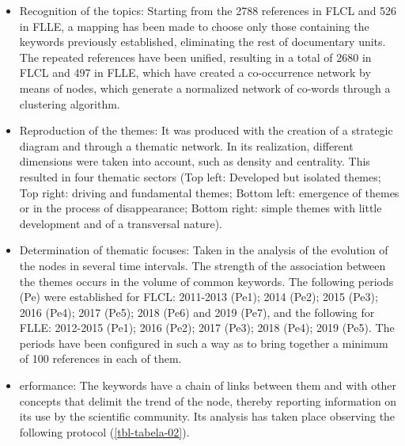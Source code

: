 \documentclass{textolivre}
\begin{document}
\begin{itemize}
    \item Recognition of the topics: Starting from the 2788 references in FLCL and 526 in FLLE, a mapping has been made to choose only those containing the keywords previously established, eliminating the rest of documentary units. The repeated references have been unified, resulting in a total of 2680 in FLCL and 497 in FLLE, which have created a co-occurrence network by means of nodes, which generate a normalized network of co-words through a clustering algorithm.
    \item Reproduction of the themes: It was produced with the creation of a strategic diagram and through a thematic network. In its realization, different dimensions were taken into account, such as density and centrality. This resulted in four thematic sectors (Top left: Developed but isolated themes; Top right: driving and fundamental themes; Bottom left: emergence of themes or in the process of disappearance; Bottom right: simple themes with little development and of a transversal nature).
    \item Determination of thematic focuses: Taken in the analysis of the evolution of the nodes in several time intervals. The strength of the association between the themes occurs in the volume of common keywords. The following periods (Pe) were established for FLCL: 2011-2013 (Pe1); 2014 (Pe2); 2015 (Pe3); 2016 (Pe4); 2017 (Pe5); 2018 (Pe6) and 2019 (Pe7), and the following for FLLE: 2012-2015 (Pe1); 2016 (Pe2); 2017 (Pe3); 2018 (Pe4); 2019 (Pe5). The periods have been configured in such a way as to bring together a minimum of 100 references in each of them.
    \item erformance: The keywords have a chain of links between them and with other concepts that delimit the trend of the node, thereby reporting information on its use by the scientific community. Its analysis has taken place observing the following protocol (\cref{tbl-tabela-02}).
\end{itemize}

\end{document}
